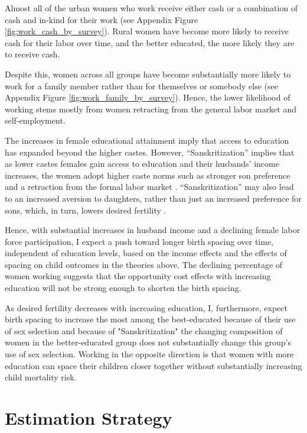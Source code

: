 \documentclass[12pt,letterpaper]{article}
\begin{document}
Almost all of the urban women who work receive either cash or a combination of 
cash and in-kind for their work (see Appendix Figure \ref{fig:work_cash_by_survey}). 
Rural women have become more likely to receive cash for their labor over time, 
and the better educated, the more likely they are to receive cash.

Despite this, women across all groups have become substantially more likely to 
work for a family member rather than for themselves or somebody else
(see Appendix Figure \ref{fig:work_family_by_survey}).
Hence, the lower likelihood of working stems mostly from women retracting from 
the general labor market and self-employment.

The increases in female educational attainment imply that access to education 
has expanded beyond the higher castes. 
However, ``Sanskritization'' implies that as lower castes females gain access to 
education and their husbands' income increases, the women adopt higher caste 
norms such as stronger son preference and a retraction from the formal labor 
market \citep{Srinivas1956,Chen1995,Abraham2013,Chatterjee2018}. 
``Sanskritization'' may also lead to an increased aversion to daughters, rather 
than just an increased preference for sons, which, in turn, lowers desired 
fertility \citep{Borooah2004}.

Hence, with substantial increases in husband income and a declining female labor force 
participation, I expect a push toward longer birth spacing over time, independent
of education levels, based on the income effects and the effects of spacing
on child outcomes in the theories above.
The declining percentage of women working suggests that the opportunity cost
effects with increasing education will not be strong enough to shorten the
birth spacing.

As desired fertility decreases with increasing education, I, furthermore, expect 
birth spacing to increase the most among the best-educated because of their 
use of sex selection and because of "Sanskritization" the changing composition 
of women in the better-educated group does not substantially change this 
group's use of sex selection.
Working in the opposite direction is that women with more education can space
their children closer together without substantially increasing child mortality risk.



\section{Estimation Strategy\label{sec:strategy}}
\end{document}
